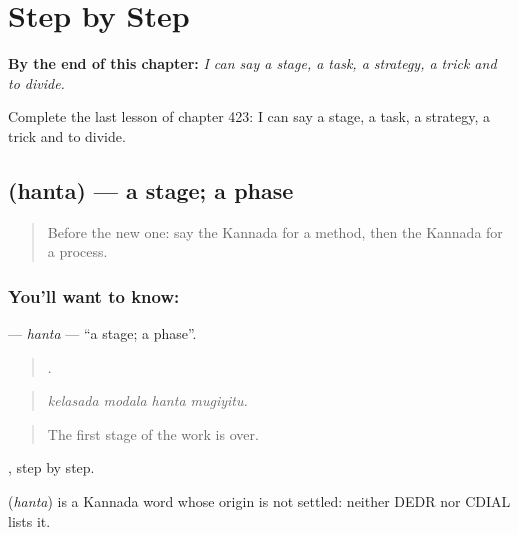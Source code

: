 
\chapter{Step by Step}
\label{ch:ka-step-by-step}

\begin{chapteropening}
\textbf{By the end of this chapter:} \emph{I can say a stage, a task, a strategy, a trick and to divide.}

Complete the last lesson of chapter 423: I can say a stage, a task, a strategy, a trick and to divide.
\end{chapteropening}

\section[\texorpdfstring{\kn{ಹಂತ} (hanta)}{ಹಂತ (hanta)}]{ (hanta) — a stage; a phase}

\label{lesson:KA-C423-hanta}



\begin{quote}
Before the new one: say the Kannada for a method, then the Kannada for a process.
\end{quote}

\subsection*{You'll want to know: }
\textbf{} — \emph{hanta} — \textquotedblleft{}a stage; a phase\textquotedblright{}.

\begin{quote}
   .
\end{quote}

\begin{quote}
\emph{kelasada modala hanta mugiyitu.}
\end{quote}

\begin{quote}
The first stage of the work is over.
\end{quote}

, step by step.

\begin{cousinweb}
\textbf{} (\emph{hanta}) is a Kannada word whose origin is not settled: neither DEDR nor CDIAL lists it.
\end{cousinweb}

